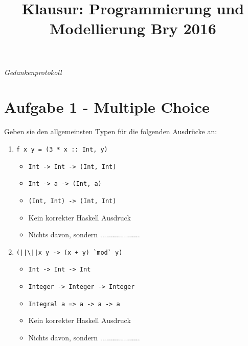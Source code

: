 \documentclass{article}
\title{Klausur: Programmierung und Modellierung Bry 2016}
\begin{document}
\maketitle

\begin{center}
\textit{Gedankenprotokoll}
\end{center}

\section*{Aufgabe 1 - Multiple Choice}
Geben sie den allgemeinsten Typen für die folgenden Ausdrücke an:
\begin{enumerate} [label={\alph*)}]
    \setlength\itemsep{0.5em}
    \item \begin{verbatim}
f x y = (3 * x :: Int, y)
          \end{verbatim}

    \begin{itemize}[label=$\square$]
        \item \begin{verbatim}
Int -> Int -> (Int, Int)
              \end{verbatim}
        \item \begin{verbatim}
Int -> a -> (Int, a)
              \end{verbatim}
        \item \begin{verbatim}
(Int, Int) -> (Int, Int)
              \end{verbatim}
        \item Kein korrekter Haskell Ausdruck
        \item Nichts davon, sondern ....................
    \end{itemize}

    \item \begin{verbatim}
(||\||x y -> (x + y) `mod` y)
          \end{verbatim}

    \begin{itemize}[label=$\square$]
        \item \begin{verbatim}
Int -> Int -> Int
              \end{verbatim}
        \item \begin{verbatim}
Integer -> Integer -> Integer
              \end{verbatim}
        \item \begin{verbatim}
Integral a => a -> a -> a
              \end{verbatim}
        \item Kein korrekter Haskell Ausdruck
        \item Nichts davon, sondern ....................
    \end{itemize}


\end{enumerate}
\end{document}
